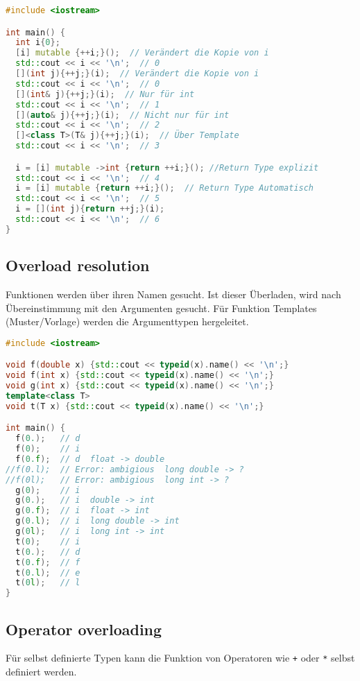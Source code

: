 \begin{lstlisting}[language=C++]
#include <iostream>

int main() {
  int i{0};
  [i] mutable {++i;}();  // Verändert die Kopie von i
  std::cout << i << '\n';  // 0
  [](int j){++j;}(i);  // Verändert die Kopie von i
  std::cout << i << '\n';  // 0
  [](int& j){++j;}(i);  // Nur für int
  std::cout << i << '\n';  // 1
  [](auto& j){++j;}(i);  // Nicht nur für int
  std::cout << i << '\n';  // 2
  []<class T>(T& j){++j;}(i);  // Über Template
  std::cout << i << '\n';  // 3

  i = [i] mutable ->int {return ++i;}(); //Return Type explizit
  std::cout << i << '\n';  // 4
  i = [i] mutable {return ++i;}();  // Return Type Automatisch
  std::cout << i << '\n';  // 5
  i = [](int j){return ++j;}(i);
  std::cout << i << '\n';  // 6
}
\end{lstlisting}

\subsection{Overload resolution}

Funktionen werden über ihren Namen gesucht. Ist dieser Überladen, wird nach
Übereinstimmung mit den Argumenten gesucht. Für Funktion Templates
(Muster/Vorlage) werden die Argumenttypen hergeleitet.

\begin{lstlisting}[language=C++]
#include <iostream>

void f(double x) {std::cout << typeid(x).name() << '\n';}
void f(int x) {std::cout << typeid(x).name() << '\n';}
void g(int x) {std::cout << typeid(x).name() << '\n';}
template<class T>
void t(T x) {std::cout << typeid(x).name() << '\n';}

int main() {
  f(0.);   // d
  f(0);    // i
  f(0.f);  // d  float -> double
//f(0.l);  // Error: ambigious  long double -> ?
//f(0l);   // Error: ambigious  long int -> ?
  g(0);    // i
  g(0.);   // i  double -> int
  g(0.f);  // i  float -> int
  g(0.l);  // i  long double -> int
  g(0l);   // i  long int -> int
  t(0);    // i
  t(0.);   // d
  t(0.f);  // f
  t(0.l);  // e
  t(0l);   // l
}
\end{lstlisting}

\subsection{Operator overloading}

Für selbst definierte Typen kann die Funktion von Operatoren wie \lstinline|+|
oder \lstinline|*| selbst definiert werden.

